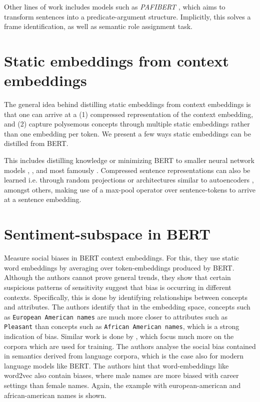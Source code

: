 \documentclass[a4paper,12pt,twoside,openright]{report}
\begin{document}
Other lines of work includes models such as \textit{PAFIBERT} \cite{tan19}, which aims to transform sentences into a predicate-argument structure.
Implicitly, this solves a frame identification, as well as semantic role assignment task. \\

\section{Static embeddings from context embeddings}

The general idea behind distilling static embeddings from context embeddings is that one can arrive at a (1) compressed representation of the context embedding, and (2) capture polysemous concepts through multiple static embeddings rather than one embedding per token. 
We present a few ways static embeddings can be distilled from BERT.

This includes  distilling knowledge or minimizing BERT to smaller neural network models \cite{tang19}, \cite{tsai19}, and most famously \cite{sanh19}.
Compressed sentence representations can also be learned i.e. through random projections or architectures similar to autoencoders \cite{shen19}, amongst others, making use of a max-pool operator over sentence-tokens to arrive at a sentence embedding. \\

\section{Sentiment-subspace in BERT}

\cite{may19} Measure social biases in BERT context embeddings.
For this, they use static word embeddings by averaging over token-embeddings produced by BERT.
Although the authors cannot prove general trends, they show that certain suspicious patterns of sensitivity suggest that bias is occurring in different contexts.
Specifically, this is done by identifying relationships between concepts and attributes. 
The authors identify that in the embedding space, concepts such as \texttt{European American names} are much more closer to attributes such as \texttt{Pleasant} than concepts such as \texttt{African American names}, which is a strong indication of bias.
Similar work is done by \cite{caliskan19}, which focus much more on the corpora which are used for training.
The authors analyse the social bias contained in semantics derived from language corpora, which is the case also for modern language models like BERT.
The authors hint that word-embeddings like word2vec also contain biases, where male names are more biased with career settings than female names.
Again, the example with european-american and african-american names is shown. \\
\end{document}
